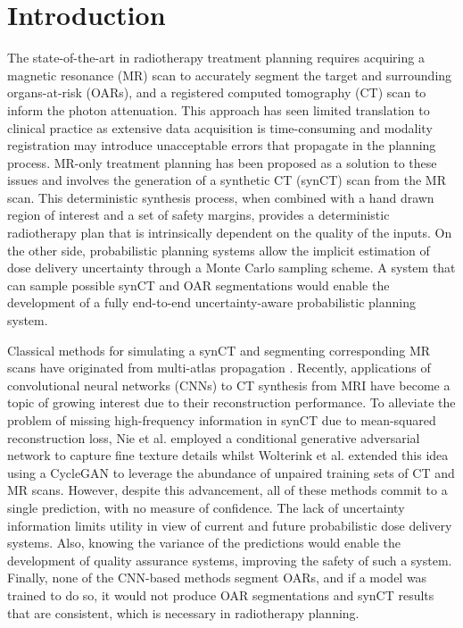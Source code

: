 \section{Introduction}
The state-of-the-art in radiotherapy treatment planning requires acquiring a magnetic resonance (MR) scan to accurately segment the target and surrounding organs-at-risk (OARs), and a registered computed tomography (CT) scan to inform the photon attenuation. This approach has seen limited translation to clinical practice as extensive data acquisition is time-consuming and modality registration may introduce unacceptable errors that propagate in the planning process. MR-only treatment planning has been proposed as a solution to these issues and involves the generation of a synthetic CT (synCT) scan from the MR scan. This deterministic synthesis process, when combined with a hand drawn region of interest and a set of safety margins, provides a deterministic radiotherapy plan that is intrinsically dependent on the quality of the inputs. On the other side, probabilistic planning systems allow the implicit estimation of dose delivery uncertainty through a Monte Carlo sampling scheme. A system that can sample possible synCT and OAR segmentations would enable the development of a fully end-to-end uncertainty-aware probabilistic planning system.  

Classical methods for simulating a synCT and segmenting corresponding MR scans have originated from multi-atlas propagation \cite{ninon2017}. Recently, applications of convolutional neural networks (CNNs) to CT synthesis from MRI have become a topic of growing interest due to their reconstruction performance. To alleviate the problem of missing high-frequency information in synCT due to mean-squared reconstruction loss, Nie et al. \cite{nie2017} employed a conditional generative adversarial network to capture fine texture details whilst Wolterink et al. \cite{wolterink2017} extended this idea using a CycleGAN to leverage the abundance of unpaired training sets of CT and MR scans. However, despite this advancement, all of these methods commit to a single prediction, with no measure of confidence. The lack of uncertainty information limits utility in view of current and future probabilistic dose delivery systems. Also, knowing the variance of the predictions would enable the development of quality assurance systems, improving the safety of such a system. Finally, none of the CNN-based methods segment OARs, and if a model was trained to do so, it would not produce OAR segmentations and synCT results that are consistent, which is necessary in radiotherapy planning.

